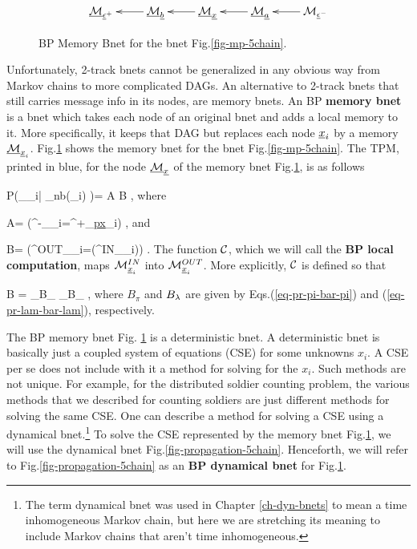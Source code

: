 \begin{figure}[h!]
$$\xymatrix{
\ucalm_{\rveps^+}
&
\ucalm_\rvb\ar[l]
&
\ucalm_\rvx\ar[l]
&
\ucalm_\rva\ar[l]
&
\calm_{\rveps^-}\ar[l]
}$$
\caption{BP Memory Bnet for the bnet
Fig.\ref{fig-mp-5chain}. }
\label{fig-mem-5chain}
\end{figure}

Unfortunately,
2-track bnets cannot be
 generalized in any
obvious way  from 
Markov chains to more
complicated DAGs.
An alternative to 2-track bnets
that still
carries message
info in its nodes,
are memory bnets. An BP
{\bf memory bnet}
is a bnet 
which takes each node
of an original
bnet and
adds a local memory to it.
More specifically,
it keeps that DAG
but replaces each node
$\rvx_i$
by a memory $\ucalm_{\rvx_i}$.
Fig.\ref{fig-mem-5chain} shows 
the memory bnet for
the bnet Fig.\ref{fig-mp-5chain}.
The TPM, printed in blue,
for the  node $\ucalm_\rvx$
of the memory bnet 
Fig.\ref{fig-mem-5chain}, is as follows

\beq\color{blue}
P(\calm_{\rvx_i}|
\calm_{\rvn\in nb(\rvx_i)}
)= A B
\;,
\eeq
where

\beq
A=
\indi(\calm^{-}_{\rvx_i}=\calm^{+}_{\ul{px}_i})
\;,
\eeq
and

\beq
B=
\indi(\calm^{OUT}_{\rvx_i}=\calc(\calm^{IN}_{\rvx_i}))
\label{eq-mp-update-static}
\;.
\eeq
The function ${\cal C}$,
which 
we will call the {\bf BP local computation},
maps $\calm^{IN}_{\rvx_i}$
into $\calm^{OUT}_{\rvx_i}$. More explicitly,
${\cal C}$ is defined so that

\beq
B
=
_{B_\pi}
_{B_\pi}
\;,
\eeq
where
$B_\pi$ and $B_\lambda$
are given by Eqs.(\ref{eq-pr-pi-bar-pi})
and (\ref{eq-pr-lam-bar-lam}),
respectively.



The BP memory bnet
 Fig.
\ref{fig-mem-5chain}
is a deterministic bnet.
A deterministic bnet
is basically
just a coupled system
of equations (CSE)
for some unknowns $x_i$. 
A CSE per se does not
include with it a method for  
solving for the $x_i$. Such methods are not
unique.
For example,
for the 
distributed
soldier counting 
problem,
the various 
methods that
we described
for counting soldiers
are just different
methods 
for solving the same
CSE.
One can describe 
a method for solving a
CSE using a dynamical bnet.\footnote{
The term
dynamical bnet
was used in Chapter \ref{ch-dyn-bnets}
to mean a time inhomogeneous
Markov chain, but 
here we are stretching its meaning to
include
Markov chains
that aren't 
time inhomogeneous.}
To solve
the CSE
represented by
the memory bnet Fig.\ref{fig-mem-5chain},
we will use the 
dynamical bnet
Fig.\ref{fig-propagation-5chain}.
Henceforth, 
we will refer to
Fig.\ref{fig-propagation-5chain} as
an {\bf BP dynamical bnet}
for Fig.\ref{fig-mem-5chain}.

